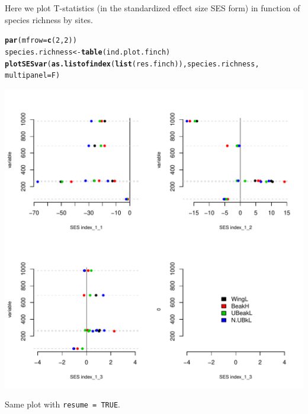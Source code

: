 \documentclass[12pt]{article}\usepackage[]{graphicx}\usepackage[]{color}
\makeatletter
\def\maxwidth{ %
  \ifdim\Gin@nat@width>\linewidth
    \linewidth
  \else
    \Gin@nat@width
  \fi
}
\newcommand{\hlnum}[1]{\textcolor[rgb]{0.686,0.059,0.569}{#1}}%
\newcommand{\hlstd}[1]{\textcolor[rgb]{0.345,0.345,0.345}{#1}}%
\newcommand{\hlkwb}[1]{\textcolor[rgb]{0.69,0.353,0.396}{#1}}%
\newcommand{\hlkwc}[1]{\textcolor[rgb]{0.333,0.667,0.333}{#1}}%
\newcommand{\hlkwd}[1]{\textcolor[rgb]{0.737,0.353,0.396}{\textbf{#1}}}%
\newenvironment{kframe}{%
 \def\at@end@of@kframe{}%
 \ifinner\ifhmode%
  \def\at@end@of@kframe{\end{minipage}}%
  \begin{minipage}{\columnwidth}%
 \fi\fi%
 \def\FrameCommand##1{\hskip\@totalleftmargin \hskip-\fboxsep
 \colorbox{shadecolor}{##1}\hskip-\fboxsep
     \hskip-\linewidth \hskip-\@totalleftmargin \hskip\columnwidth}%
 \MakeFramed {\advance\hsize-\width
   \@totalleftmargin\z@ \linewidth\hsize
   \@setminipage}}%
 {\par\unskip\endMakeFramed%
 \at@end@of@kframe}
\newenvironment{knitrout}{}{} %
\makeatother
\begin{document}
Here we plot T-statistics (in the standardized effect size SES form) in function of species richness by sites.

\begin{knitrout}
\color{fgcolor}\begin{kframe}
\begin{alltt}
\hlkwd{par}\hlstd{(}\hlkwc{mfrow} \hlstd{=} \hlkwd{c}\hlstd{(}\hlnum{2}\hlstd{,}\hlnum{2}\hlstd{))}
\hlstd{species.richness}\hlkwb{<-}\hlkwd{table}\hlstd{(ind.plot.finch)}
\hlkwd{plotSESvar}\hlstd{(}\hlkwd{as.listofindex}\hlstd{(}\hlkwd{list}\hlstd{(res.finch)), species.richness,}
       \hlkwc{multipanel} \hlstd{= F)}
\end{alltt}
\end{kframe}
\includegraphics[width=\maxwidth]{figure/unnamed-chunk-41-1} 

\end{knitrout}

Same plot with \texttt{resume = TRUE}.
\end{document}
